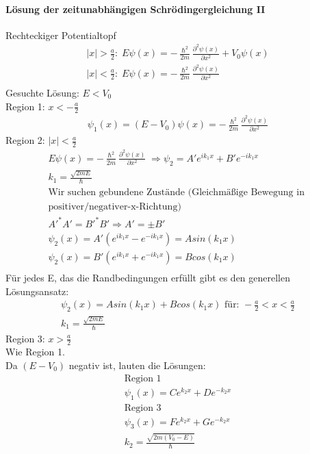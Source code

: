 \documentclass[10pt,a4paper]{article}
\begin{document}
\paragraph{Lösung der zeitunabhängigen Schrödingergleichung II}$\;$\\
Rechteckiger Potentialtopf\\
\begin{align}
|x|>\frac{a}{2}:\; E\psi(x)= -\frac{\hslash^2}{2m}\frac{\partial^2\psi(x)}{\partial x^2} + V_0\psi(x)\\
|x|<\frac{a}{2}:\; E\psi(x)= -\frac{\hslash^2}{2m}\frac{\partial^2\psi(x)}{\partial x^2}\\
\end{align}
Gesuchte Lösung: $E<V_0$\\
Region 1: $x<-\frac{a}{2}$\\
\begin{align}
\psi_1(x)=(E-V_0)\psi(x)=-\frac{\hslash^2}{2m}\frac{\partial^2\psi(x)}{\partial x^2}
\end{align}
Region 2: $|x|<\frac{a}{2}$\\
\begin{align}
E\psi(x)= -\frac{\hslash^2}{2m}\frac{\partial^2\psi(x)}{\partial x^2} \;\Rightarrow \psi_2= A'e^{ik_1x}+B'e^{-ik_1x}\\
k_1=\frac{\sqrt{2mE}}{\hslash}\\
\text{Wir suchen gebundene Zustände (Gleichmäßige Bewegung in }\\\text{positiver/negativer-x-Richtung)}\\
A'^*A'=B'^*B' \Rightarrow A'=\pm B'\\
\psi_2(x) = A'(e^{ik_1x}-e^{-ik_1x}) = Asin(k_1x)\\
\psi_2(x) = B'(e^{ik_1x}+e^{-ik_1x}) = Bcos(k_1x)\\
\end{align}
Für jedes E, das die Randbedingungen erfüllt gibt es den generellen Lösungsansatz:
\begin{align}
\psi_2(x)=Asin(k_1x)+Bcos(k_1x) \text{ für: } -\frac{a}{2}<x<\frac{a}{2}\\ k_1=\frac{\sqrt{2mE}}{\hslash}
\end{align}
Region 3: $x>\frac{a}{2}$\\
Wie Region 1.\\
Da $(E-V_0)$ negativ ist, lauten die Lösungen:
\begin{align}
\text{Region 1}\\
\psi_1(x)=Ce^{k_2x}+De^{-k_2x}\\
\text{Region 3}\\
\psi_3(x)=Fe^{k_2x}+Ge^{-k_2x}\\
k_2=\frac{\sqrt{2m(V_0-E)}}{\hslash}
\end{align}
\end{document}
